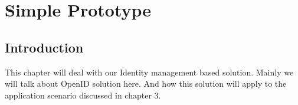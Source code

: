 \chapter{Simple Prototype}
\section{Introduction}
This chapter will deal with our Identity management based solution. Mainly we will talk about OpenID solution here. And how this solution will apply to the application scenario discussed in chapter 3.